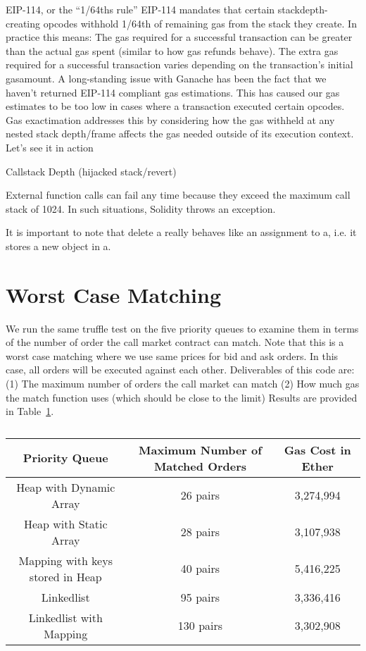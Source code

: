 EIP-114, or the “1/64ths rule”
EIP-114 mandates that certain stackdepth-creating opcodes withhold 1/64th of remaining gas from the stack they create. In practice this means:
The gas required for a successful transaction can be greater than the actual gas spent (similar to how gas refunds behave).
The extra gas required for a successful transaction varies depending on the transaction’s initial gasamount.
A long-standing issue with Ganache has been the fact that we haven’t returned EIP-114 compliant gas estimations. This has caused our gas estimates to be too low in cases where a transaction executed certain opcodes. Gas exactimation addresses this by considering how the gas withheld at any nested stack depth/frame affects the gas needed outside of its execution context.
Let’s see it in action


Callstack Depth (hijacked stack/revert)

External function calls can fail any time because they exceed the maximum call stack of 1024. In such situations, Solidity throws an exception.





It is important to note that delete a really behaves like an assignment to a, i.e. it stores a new object in a.

 \section{Worst Case Matching}
 We run the same truffle test on the five priority queues to examine them in terms of the number of order the call market contract can match.
 Note that this is a worst case matching where we use same prices for bid and ask orders. In this case, all orders will be executed against each other.
 Deliverables of this code are: (1) The maximum number of orders the call market can match (2) How much gas the match function uses (which should be close to the limit)
Results are provided in Table~\ref{tab:worst_case_matching}.


\begin{table}[t]
\centering
\begin{tabular}{|c|c|c|}
\hline
\textbf{Priority Queue} & \textbf{Maximum Number of Matched Orders} & \textbf{Gas Cost in Ether}  \\ \hline
 
Heap with Dynamic Array & 26 pairs & 3,274,994 \\ \hline
Heap with Static Array & 28 pairs & 3,107,938 \\ \hline
Mapping with keys stored in Heap & 40 pairs & 5,416,225 \\ \hline
Linkedlist & 95 pairs & 3,336,416 \\ \hline
Linkedlist with Mapping & 130 pairs & 3,302,908 \\ \hline

\end{tabular}
\caption{\footnotesize{}\label{tab:worst_case_matching}}
\end{table}

